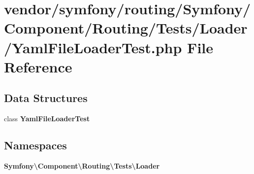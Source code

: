 \section{vendor/symfony/routing/\+Symfony/\+Component/\+Routing/\+Tests/\+Loader/\+Yaml\+File\+Loader\+Test.php File Reference}
\label{routing_2_symfony_2_component_2_routing_2_tests_2_loader_2_yaml_file_loader_test_8php}
\subsection*{Data Structures}
\begin{DoxyCompactItemize}
\item 
class {\bf Yaml\+File\+Loader\+Test}
\end{DoxyCompactItemize}
\subsection*{Namespaces}
\begin{DoxyCompactItemize}
\item 
 {\bf Symfony\textbackslash{}\+Component\textbackslash{}\+Routing\textbackslash{}\+Tests\textbackslash{}\+Loader}
\end{DoxyCompactItemize}
